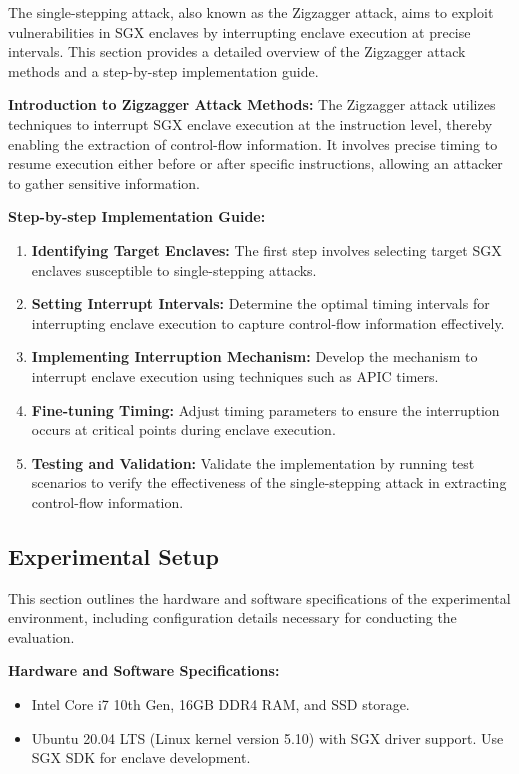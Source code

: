 \documentclass{llncs}
\begin{document}
The single-stepping attack, also known as the Zigzagger attack, aims to exploit vulnerabilities in SGX enclaves by interrupting enclave execution at precise intervals. This section provides a detailed overview of the Zigzagger attack methods and a step-by-step implementation guide.

\textbf{Introduction to Zigzagger Attack Methods:}
The Zigzagger attack utilizes techniques to interrupt SGX enclave execution at the instruction level, thereby enabling the extraction of control-flow information. It involves precise timing to resume execution either before or after specific instructions, allowing an attacker to gather sensitive information.

\textbf{Step-by-step Implementation Guide:}
\begin{enumerate}
  \item \textbf{Identifying Target Enclaves:} The first step involves selecting target SGX enclaves susceptible to single-stepping attacks.
  \item \textbf{Setting Interrupt Intervals:} Determine the optimal timing intervals for interrupting enclave execution to capture control-flow information effectively.
  \item \textbf{Implementing Interruption Mechanism:} Develop the mechanism to interrupt enclave execution using techniques such as APIC timers.
  \item \textbf{Fine-tuning Timing:} Adjust timing parameters to ensure the interruption occurs at critical points during enclave execution.
  \item \textbf{Testing and Validation:} Validate the implementation by running test scenarios to verify the effectiveness of the single-stepping attack in extracting control-flow information.
\end{enumerate}

\subsection{Experimental Setup}

This section outlines the hardware and software specifications of the experimental environment, including configuration details necessary for conducting the evaluation.

\textbf{Hardware and Software Specifications:}
\begin{itemize}
  \item Intel Core i7 10th Gen, 16GB DDR4 RAM, and SSD storage.
  \item Ubuntu 20.04 LTS (Linux kernel version 5.10) with SGX driver support. Use SGX SDK for enclave development.
\end{itemize}
\end{document}
